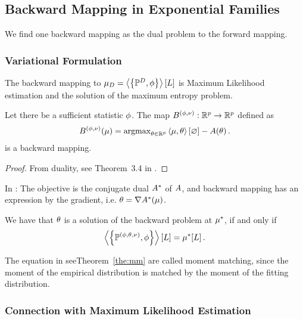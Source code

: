 \subsection{Backward Mapping in Exponential Families}

We find one backward mapping as the dual problem to the forward mapping.

\subsubsection{Variational Formulation}

The backward mapping to $\mu_{D} = \left\langle \left\{\mathbb{P}^{D}, \phi\right\}\right\rangle \left[ L \right]$ is Maximum Likelihood estimation and the solution of the maximum entropy problem.

\begin{lemma}
	Let there be a sufficient statistic $\phi$.
	The map $B^{(\phi,\nu)}: \mathbb{R}^{p}\rightarrow \mathbb{R}^{p}$ defined as
	\begin{align*}
		B^{(\phi,\nu)}(\mu) = \mathrm{argmax}_{\theta\in\mathbb{R}^{p}}  \left\langle \mu,\theta\right\rangle \left[ \varnothing \right] - A(\theta) \, . 
	\end{align*}
	is a backward mapping.
\end{lemma}
\begin{proof}
	From duality, see Theorem~3.4 in \cite{wainwright_graphical_2008}.
\end{proof}

In \cite{wainwright_graphical_2008}: The objective is the conjugate dual $A^*$ of $A$, and backward mapping has an expression by the gradient, i.e. $\theta = \nabla A^*(\mu)$.


\begin{theorem}\label{the:MM}
	We have that $\theta$ is a solution of the backward problem at $\mu^*$, if and only if 
		\[ \left\langle \left\{\mathbb{P}^{(\phi,\theta,\nu)},\phi\right\}\right\rangle \left[ L \right] = \mu^*[L] \, . \]
\end{theorem}

The equation in seeTheorem~\ref{the:mm} are called moment matching, since the moment of the empirical distribution is matched by the moment of the fitting distribution.




\subsubsection{Connection with Maximum Likelihood Estimation}

